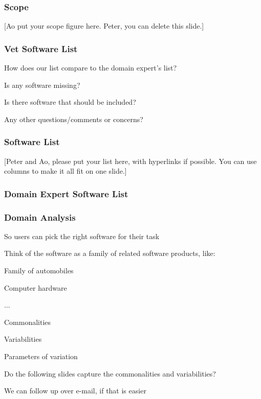 \documentclass[t,12pt,numbers,fleqn]{beamer}
\begin{document}

\begin{frame}
\frametitle{Scope}

[Ao put your scope figure here.  Peter, you can delete this slide.]

\end{frame}


\begin{frame}
\frametitle{Vet Software List}

\bi
\item How does our list compare to the domain expert's list?
\item Is any software missing?
\item Is there software that should be included?
\item Any other questions/comments or concerns?  
\ei
  
\end{frame}


\begin{frame}
\frametitle{Software List}

[Peter and Ao, please put your list here, with hyperlinks if possible.  You can use
columns to make it all fit on one slide.]

\end{frame}


\begin{frame}
\frametitle{Domain Expert Software List}


\end{frame}


\begin{frame}
\frametitle{Domain Analysis}

\bi
\item So users can pick the right software for their task
\item Think of the software as a family of related software products, like:
\bi
\item Family of automobiles
\item Computer hardware
\item ...
\ei
\item Commonalities
\item Variabilities
\item Parameters of variation
\item Do the following slides capture the commonalities and variabilities?
\item We can follow up over e-mail, if that is easier
\ei

\end{frame}
\end{document}
